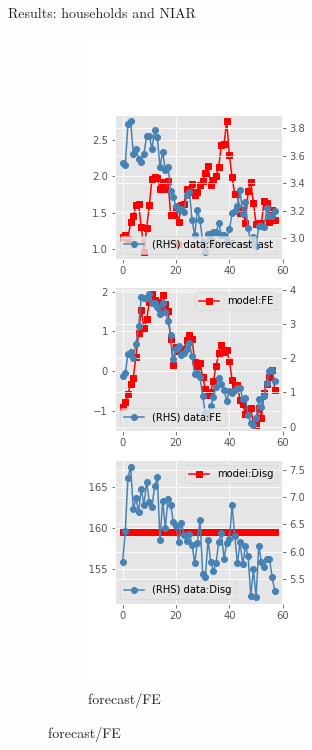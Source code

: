 \documentclass{beamer}
\begin{document}
\begin{frame}{Results: households and NIAR}
\begin{figure}[ht]
\begin{subfigure}[b]{0.19\textwidth}
		\end{subfigure}
		\hfill
		\begin{subfigure}[b]{0.19\textwidth}
			\caption{forecast/FE}
			\includegraphics[width=\textwidth, height = 0.8\textheight]{figuresDraft/sce_ni_est_diag2.png}

\end{subfigure}
\end{figure}
\end{frame}
\end{document}
